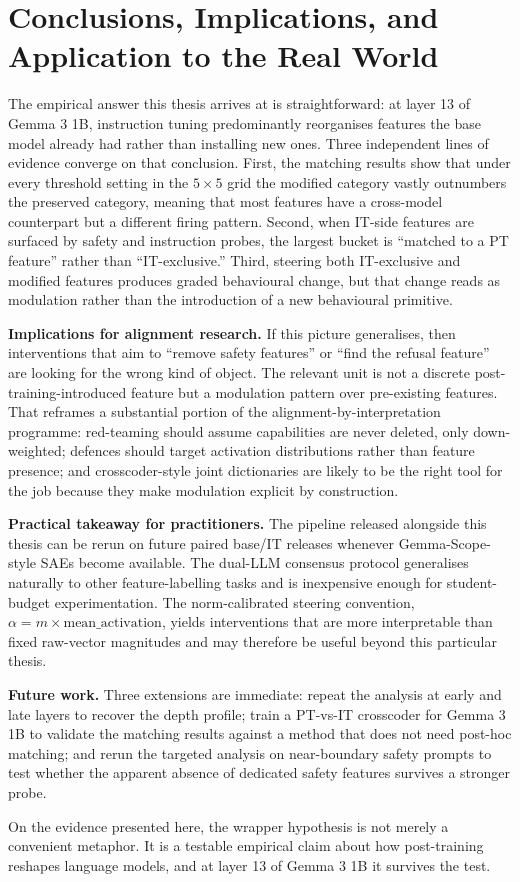 \section{Conclusions, Implications, and Application to the Real World}
\label{sec:conclusions}

The empirical answer this thesis arrives at is straightforward: at layer 13 of Gemma 3 1B, instruction tuning predominantly reorganises features the base model already had rather than installing new ones. Three independent lines of evidence converge on that conclusion. First, the matching results show that under every threshold setting in the $5 \times 5$ grid the modified category vastly outnumbers the preserved category, meaning that most features have a cross-model counterpart but a different firing pattern. Second, when IT-side features are surfaced by safety and instruction probes, the largest bucket is ``matched to a PT feature'' rather than ``IT-exclusive.'' Third, steering both IT-exclusive and modified features produces graded behavioural change, but that change reads as modulation rather than the introduction of a new behavioural primitive.

\textbf{Implications for alignment research.} If this picture generalises, then interventions that aim to ``remove safety features'' or ``find the refusal feature'' are looking for the wrong kind of object. The relevant unit is not a discrete post-training-introduced feature but a modulation pattern over pre-existing features. That reframes a substantial portion of the alignment-by-interpretation programme: red-teaming should assume capabilities are never deleted, only down-weighted; defences should target activation distributions rather than feature presence; and crosscoder-style joint dictionaries are likely to be the right tool for the job because they make modulation explicit by construction.

\textbf{Practical takeaway for practitioners.} The pipeline released alongside this thesis can be rerun on future paired base/IT releases whenever Gemma-Scope-style SAEs become available. The dual-LLM consensus protocol generalises naturally to other feature-labelling tasks and is inexpensive enough for student-budget experimentation. The norm-calibrated steering convention, $\alpha = m \times \text{mean\_activation}$, yields interventions that are more interpretable than fixed raw-vector magnitudes and may therefore be useful beyond this particular thesis.

\textbf{Future work.} Three extensions are immediate: repeat the analysis at early and late layers to recover the depth profile; train a PT-vs-IT crosscoder for Gemma 3 1B to validate the matching results against a method that does not need post-hoc matching; and rerun the targeted analysis on near-boundary safety prompts to test whether the apparent absence of dedicated safety features survives a stronger probe.

On the evidence presented here, the wrapper hypothesis is not merely a convenient metaphor. It is a testable empirical claim about how post-training reshapes language models, and at layer 13 of Gemma 3 1B it survives the test.
